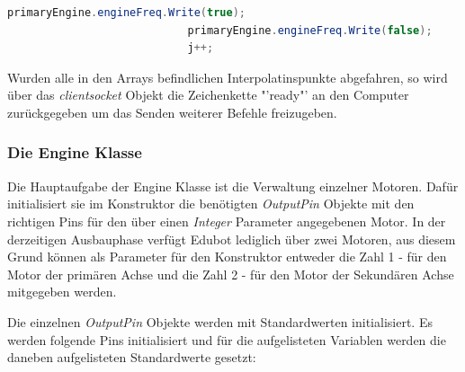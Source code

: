 \begin{itemize}
\begin{lstlisting}[language = csharp, captionpos=b, caption={Beispiel für die Motorsynchronisation}]
                            primaryEngine.engineFreq.Write(true);
                            primaryEngine.engineFreq.Write(false);
                            j++;
\end{lstlisting}

Wurden alle in den Arrays befindlichen Interpolatinspunkte abgefahren, so wird über das \textit{clientsocket} Objekt die Zeichenkette "'ready"' an den Computer zurückgegeben um das Senden weiterer Befehle freizugeben.

\end{itemize}

\newpage

\subsubsection{Die Engine Klasse}

Die Hauptaufgabe der Engine Klasse ist die Verwaltung einzelner Motoren. Dafür initialisiert sie im Konstruktor die benötigten \textit{OutputPin} Objekte mit den richtigen Pins für den über einen \textit{Integer} Parameter angegebenen Motor. In der derzeitigen Ausbauphase verfügt Edubot lediglich über zwei Motoren, aus diesem Grund können als Parameter für den Konstruktor entweder die Zahl 1 - für den Motor der primären Achse und die Zahl 2 - für den Motor der Sekundären Achse mitgegeben werden.

Die einzelnen \textit{OutputPin} Objekte werden mit Standardwerten initialisiert. Es werden folgende Pins initialisiert und für die aufgelisteten Variablen werden die daneben aufgelisteten Standardwerte gesetzt:

